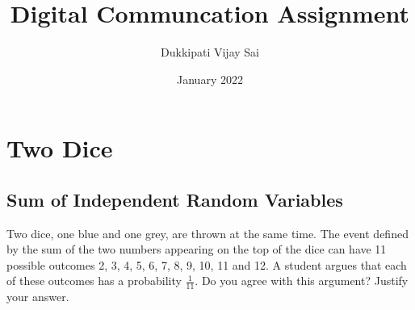 \documentclass[journal,10pt,twocolumn]{IEEEtran}
\numberwithin{equation}{subsection}
\numberwithin{figure}{subsection}
\begin{document}
\title{Digital Communcation Assignment}

\author{Dukkipati Vijay Sai}
\date{January 2022}

\maketitle

\tableofcontents

\bigskip


\section{Two Dice}
\subsection{\textbf{Sum of Independent Random Variables}}
Two dice, one blue and one grey, are thrown at the same time.   The event defined by the sum of the two numbers appearing on the top of the dice can have 11 possible outcomes 2, 3, 4, 5, 6, 7, 8, 9, 10, 11 and 12.  A student argues that each of these outcomes has a probability $\frac{1}{11}$.  Do you agree with this argument?  Justify your answer.
\end{document}

